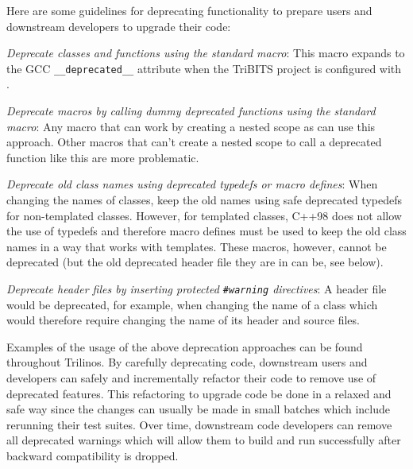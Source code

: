 \documentclass[11pt]{SANDreport}
\begin{document}
Here are some guidelines for deprecating functionality to prepare
users and downstream developers to upgrade their code:

\begin{compactitem}

{}\item\textit{Deprecate classes and functions using the standard
{} macro}: This macro expands to the
GCC {}\texttt{\_\_deprecated\_\_} attribute when the TriBITS project
is configured with {}.

{}\item\textit{Deprecate macros by calling dummy deprecated functions
using the standard {} macro}: Any
macro that can work by creating a nested scope as {} can use this approach.  Other macros
that can't create a nested scope to call a deprecated function like
this are more problematic.

{}\item\textit{Deprecate old class names using deprecated typedefs or
macro defines}: When changing the names of classes, keep the old names
using safe deprecated typedefs for non-templated classes.  However,
for templated classes, C++98 does not allow the use of typedefs and
therefore macro defines must be used to keep the old class names in a
way that works with templates.  These macros, however, cannot be
deprecated (but the old deprecated header file they are in can be, see
below).

{}\item\textit{Deprecate header files by inserting protected
{}\texttt{\#warning} directives}: A header file would be deprecated,
for example, when changing the name of a class which would therefore
require changing the name of its header and source files.

\end{compactitem}

Examples of the usage of the above deprecation approaches can be found
throughout Trilinos.  By carefully deprecating code, downstream users
and developers can safely and incrementally refactor their code to
remove use of deprecated features.  This refactoring to upgrade code
be done in a relaxed and safe way since the changes can usually be
made in small batches which include rerunning their test suites.  Over
time, downstream code developers can remove all deprecated warnings
which will allow them to build and run successfully after backward
compatibility is dropped.
\end{document}
